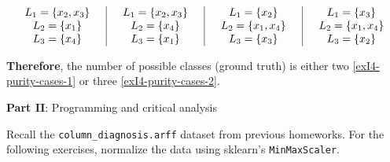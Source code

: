 \documentclass[12pt]{article}
\begin{document}
\begin{enumerate}[leftmargin=\labelsep]
        \begin{equation}\label{exI4-purity-cases-2}
          \begin{array}{c|c|c|c}
            \centering
            L_1 = \left\{x_2, x_3\right\} \quad & \quad L_1 = \left\{x_2, x_3\right\} \quad & \quad L_1 = \left\{x_2\right\} \quad      & \quad L_1 = \left\{x_3\right\}      \\
            L_2 = \left\{x_1\right\} \quad      & \quad L_2 = \left\{x_4\right\} \quad      & \quad L_2 = \left\{x_1, x_4\right\} \quad & \quad L_2 = \left\{x_1, x_4\right\} \\
            L_3 = \left\{x_4\right\} \quad      & \quad L_3 = \left\{x_1\right\} \quad      & \quad L_3 = \left\{x_3\right\} \quad      & \quad L_3 = \left\{x_2\right\}
          \end{array}
        \end{equation}

        \textbf{Therefore}, the number of possible classes (ground truth) is either two \eqref{exI4-purity-cases-1} or three \eqref{exI4-purity-cases-2}.
\end{enumerate}

\vskip 0.5cm

\begin{center}
  \large{\textbf{Part II}: Programming and critical analysis}\normalsize
\end{center}

\noindent Recall the \texttt{column\_diagnosis.arff} dataset from previous homeworks. For the following exercises,
normalize the data using sklearn's \texttt{MinMaxScaler}.
\end{document}
